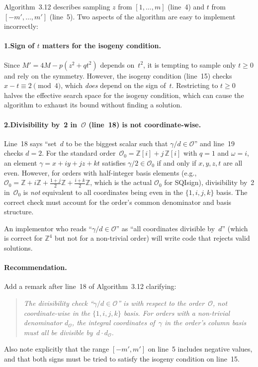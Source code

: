 \documentclass[a4paper,11pt]{article}
\newcommand{\algo}[1]{Algorithm~#1}
\begin{document}
\algo{3.12} describes sampling $z$ from $[1, \ldots, m]$ (line~4)
and $t$ from $[-m', \ldots, m']$ (line~5).  Two aspects of the
algorithm are easy to implement incorrectly:

\paragraph{1.\enspace Sign of $t$ matters for the isogeny condition.}
Since $M' = 4M - p(z^2 + qt^2)$ depends on~$t^2$, it is tempting
to sample only $t \geq 0$ and rely on the symmetry.  However, the
isogeny condition (line~15) checks $x - t \equiv 2 \pmod{4}$, which
\emph{does} depend on the sign of~$t$.  Restricting to $t \geq 0$
halves the effective search space for the isogeny condition, which
can cause the algorithm to exhaust its bound without finding a
solution.

\paragraph{2.\enspace Divisibility by~2 in~$\mathcal{O}$
(line~18) is not coordinate-wise.}
Line~18 says ``set~$d$ to be the biggest scalar such that
$\gamma / d \in \mathcal{O}$'' and line~19 checks $d = 2$.
For the standard order~$\mathcal{O}_0 = \mathbb{Z}[i] +
j\,\mathbb{Z}[i]$ with $q = 1$ and $\omega = i$, an element
$\gamma = x + iy + jz + kt$ satisfies $\gamma/2 \in
\mathcal{O}_0$ if and only if $x, y, z, t$ are all even.  However,
for orders with half-integer basis elements (e.g.,
$\mathcal{O}_0 = \mathbb{Z} + i\mathbb{Z} + \frac{1+j}{2}\mathbb{Z}
+ \frac{i+k}{2}\mathbb{Z}$, which is the actual $\mathcal{O}_0$
for SQIsign), divisibility by~2 in~$\mathcal{O}_0$ is
\emph{not} equivalent to all coordinates being even in the
$\{1, i, j, k\}$ basis.  The correct check must account for the
order's common denominator and basis structure.

An implementor who reads ``$\gamma / d \in \mathcal{O}$'' as
``all coordinates divisible by~$d$'' (which is correct for
$\mathbb{Z}^4$ but not for a non-trivial order) will write code
that rejects valid solutions.

\paragraph{Recommendation.}
Add a remark after line~18 of \algo{3.12} clarifying:
\begin{quote}
  \itshape The divisibility check ``$\gamma / d \in \mathcal{O}$''
  is with respect to the order~$\mathcal{O}$, not
  coordinate-wise in the $\{1, i, j, k\}$ basis.  For orders with
  a non-trivial denominator $d_{\mathcal{O}}$, the integral
  coordinates of~$\gamma$ in the order's column basis must all be
  divisible by~$d \cdot d_{\mathcal{O}}$.
\end{quote}
Also note explicitly that the range $[-m', m']$ on line~5 includes
negative values, and that both signs must be tried to satisfy the
isogeny condition on line~15.
\end{document}
